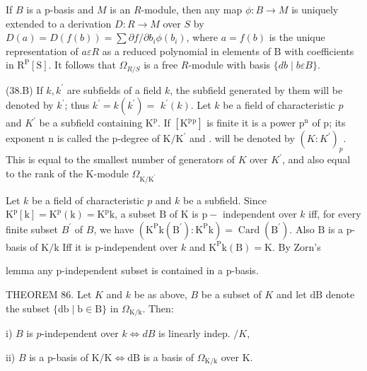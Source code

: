 If $B$ is a p-basis and $M$ is an $R$-module, then any map $\phi: B \rightarrow M$ is uniquely extended to a derivation $D: R \rightarrow M$ over $S$ by $D(a)=D(f(b))=\sum \partial f / \partial b_{i} \phi\left(b_{i}\right)$, where $a=f(b)$ is the unique representation of $a \varepsilon R$ as a reduced polynomial in elements of $\mathrm{B}$ with coefficients in $\mathrm{R}^{\mathrm{P}}[\mathrm{S}]$. It follows that $\Omega_{R / S}$ is a free $R$-module with basis $\{d b \mid b \varepsilon B\}$.

(38.B) If $k, k^{\prime}$ are subfields of a field $k$, the subfield generated by them will be denoted by $k^{\prime}$; thus $k^{\prime}=k\left(k^{\prime}\right)=$ $k^{\prime}(k)$. Let $k$ be a field of characteristic $p$ and $K^{\prime}$ be a subfield containing $\mathrm{K}^{\mathrm{p}}$. If $\left[\mathrm{K}^{\mathrm{p}}{ }^{\mathrm{p}}\right]$ is finite it is a power $\mathrm{p}^{\mathrm{n}}$ of $\mathrm{p}$; its exponent $\mathrm{n}$ is called the $\mathrm{p}$-degree of $\mathrm{K} / \mathrm{K}^{\prime}$ and . will be denoted by $\left(K: K^{\prime}\right)_{p}$. This is equal to the smallest number of generators of $K$ over $K^{\prime}$, and also equal to the rank of the $\mathrm{K}$-module $\Omega_{\mathrm{K} / \mathrm{K}^{\prime}}$

Let $k$ be a field of characteristic $p$ and $k$ be a subfield. Since $\mathrm{K}^{\mathrm{p}}[\mathrm{k}]=\mathrm{K}^{\mathrm{p}}(\mathrm{k})=\mathrm{K}^{\mathrm{p}} \mathrm{k}$, a subset $\mathrm{B}$ of $\mathrm{K}$ is $\mathrm{p}-$ independent over $k$ iff, for every finite subset $B^{\prime}$ of $B$, we have $\left(\mathrm{K}^{\mathrm{P}} \mathrm{k}\left(\mathrm{B}^{\prime}\right): \mathrm{K}^{\mathrm{P}} \mathrm{k}\right)=\operatorname{Card}\left(\mathrm{B}^{\prime}\right)$. Also $\mathrm{B}$ is a p-basis of $\mathrm{K} / \mathrm{k}$ Iff it is p-independent over $k$ and $\mathrm{K}^{\mathrm{P}} \mathrm{k}(\mathrm{B})=\mathrm{K}$. By Zorn's

lemma any p-independent subset is contained in a p-basis.

THEOREM 86. Let $K$ and $k$ be as above, $B$ be a subset of $K$ and let $\mathrm{dB}$ denote the subset $\{\mathrm{db} \mid \mathrm{b} \in \mathrm{B}\}$ in $\Omega_{\mathrm{K} / \mathrm{k}}$. Then:

i) $B$ is $p$-independent over $k \Leftrightarrow d B$ is linearly indep. $/ K$,

ii) $B$ is a p-basis of $\mathrm{K} / \mathrm{K} \Leftrightarrow \mathrm{dB}$ is a basis of $\Omega_{\mathrm{K} / \mathrm{k}}$ over $\mathrm{K}$.


